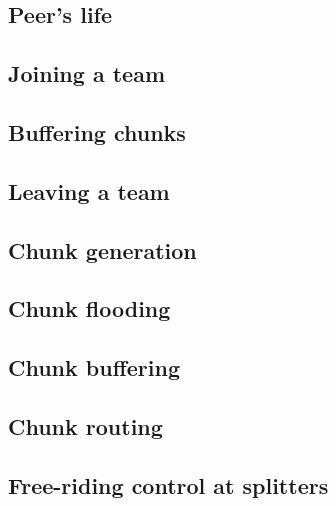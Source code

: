 

\subsection{Peer's life}


\subsection{Joining a team}


\subsection{Buffering chunks}


\subsection{Leaving a team}


\subsection{Chunk generation}


\subsection{Chunk flooding}


\subsection{Chunk buffering}


\subsection{Chunk routing}


\subsection{Free-riding control at splitters}


%

